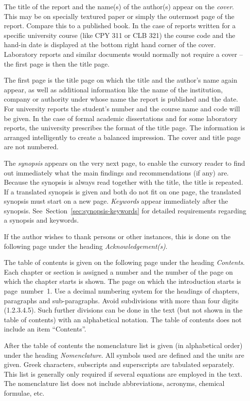 \documentclass[a5paper, 10pt]{article}
\newcommand{\subsectionname}[1]{\emph{#1}}
\begin{document}
The title of the report and the name(s) of the author(s) appear on the
\emph{cover}. This may be on specially textured paper or simply the
outermost page of the report.  Compare this to a published book.  In
the case of reports written for a specific university course (like CPY
311 or CLB 321) the course code and the hand-in date is displayed at
the bottom right hand corner of the cover.  Laboratory reports and
similar documents would normally not require a cover -- the first page
is then the title page.

The first page is the title page on which the title and the author's
name again appear, as well as additional information like the name of
the institution, company or authority under whose name the report is
published and the date.  For university reports the student's number
and the course name and code will be given.  In the case of formal
academic dissertations and for some laboratory reports, the university
prescribes the format of the title page.  The information is arranged
intelligently to create a balanced impression.  The cover and title
page are not numbered.

The \subsectionname{synopsis} appears on the very next page, to enable
the cursory reader to find out immediately what the main findings and
recommendations (if any) are.  Because the synopsis is always read
together with the title, the title is repeated.  If a translated
synopsis is given and both do not fit on one page, the translated
synopsis must start on a new page.
\subsectionname{Keywords} appear immediately after
the synopsis.  See~Section~\ref{sec:synopsis-keywords} for detailed
requirements regarding a synopsis and keywords.

If the author wishes to thank persons or other instances, this is done
on the following page under the
heading \subsectionname{Acknowledgement(s)}.

The table of contents is given on the following page under the heading
\subsectionname{Contents}.  Each chapter or section is assigned a number and the number
of the page on which the chapter starts is shown.  The page on which
the introduction starts is page~number~1.  Use a decimal numbering
system for the headings of chapters, paragraphs and sub-paragraphs.
Avoid subdivisions with more than four digits (1.2.3.4.5).  Such
further divisions can be done in the text (but not shown in the table
of contents) with an alphabetical notation. The table of contents does
not include an item ``Contents''.

After the table of contents the nomenclature list is given (in
alphabetical order) under the heading \subsectionname{Nomenclature}.  All
symbols used are defined and the units are given.  Greek
characters, subscripts and superscripts are tabulated separately.
This list is generally only required if several equations are employed
in the text.  The nomenclature list does not include abbreviations,
acronyms, chemical formulae, etc.
\end{document}
